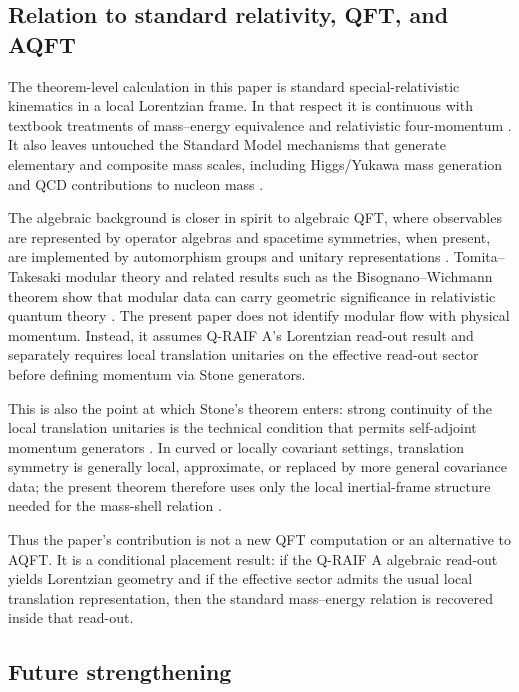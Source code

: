 \documentclass[12pt,a4paper]{article}
\theoremstyle{definition}
\theoremstyle{remark}
\begin{document}
\subsection{Relation to standard relativity, QFT, and AQFT}
\label{sec:mainstream-relation}

The theorem-level calculation in this paper is standard special-relativistic kinematics in a local Lorentzian frame. In that respect it is continuous with textbook treatments of mass--energy equivalence and relativistic four-momentum \cite{Einstein1905,Rindler2006,Wald1984}. It also leaves untouched the Standard Model mechanisms that generate elementary and composite mass scales, including Higgs/Yukawa mass generation and QCD contributions to nucleon mass \cite{PeskinSchroeder1995,WeinbergQFT2,Ji1995,Durr2008}.

The algebraic background is closer in spirit to algebraic QFT, where observables are represented by operator algebras and spacetime symmetries, when present, are implemented by automorphism groups and unitary representations \cite{Haag1996}. Tomita--Takesaki modular theory and related results such as the Bisognano--Wichmann theorem show that modular data can carry geometric significance in relativistic quantum theory \cite{Takesaki2003,BisognanoWichmann1975,Witten2018}. The present paper does not identify modular flow with physical momentum. Instead, it assumes Q-RAIF A's Lorentzian read-out result and separately requires local translation unitaries on the effective read-out sector before defining momentum via Stone generators.

This is also the point at which Stone's theorem enters: strong continuity of the local translation unitaries is the technical condition that permits self-adjoint momentum generators \cite{Stone1932,ReedSimon1972}. In curved or locally covariant settings, translation symmetry is generally local, approximate, or replaced by more general covariance data; the present theorem therefore uses only the local inertial-frame structure needed for the mass-shell relation \cite{BrunettiFredenhagenVerch2003}.

Thus the paper's contribution is not a new QFT computation or an alternative to AQFT. It is a conditional placement result: if the Q-RAIF A algebraic read-out yields Lorentzian geometry and if the effective sector admits the usual local translation representation, then the standard mass--energy relation is recovered inside that read-out.

\subsection{Future strengthening}
\end{document}
